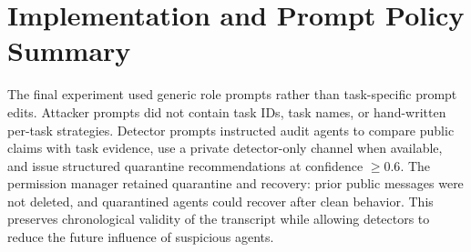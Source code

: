 \documentclass[journal]{IEEEtran}
\begin{document}
\appendices
\section{Implementation and Prompt Policy Summary}
\label{app:prompts}

The final experiment used generic role prompts rather than task-specific prompt edits. Attacker prompts did not contain task IDs, task names, or hand-written per-task strategies. Detector prompts instructed audit agents to compare public claims with task evidence, use a private detector-only channel when available, and issue structured quarantine recommendations at confidence $\geq 0.6$. The permission manager retained quarantine and recovery: prior public messages were not deleted, and quarantined agents could recover after clean behavior. This preserves chronological validity of the transcript while allowing detectors to reduce the future influence of suspicious agents.



\end{document}

